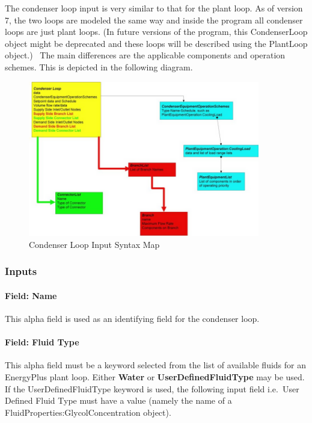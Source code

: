 The condenser loop input is very similar to that for the plant loop. As of version 7, the two loops are modeled the same way and inside the program all condenser loops are just plant loops. (In future versions of the program, this CondenserLoop object might be deprecated and these loops will be described using the PlantLoop object.)~ The main differences are the applicable components and operation schemes. This is depicted in the following diagram.

\begin{figure}[hbtp] %
\centering
\includegraphics[width=0.9\textwidth, height=0.9\textheight, keepaspectratio=true]{media/image136.png}
\caption{Condenser Loop Input Syntax Map \protect \label{fig:condenser-loop-input-syntax-map}}
\end{figure}

\subsubsection{Inputs}\label{inputs-1-032}

\paragraph{Field: Name}\label{field-name-1-031}

This alpha field is used as an identifying field for the condenser loop.

\paragraph{Field: Fluid Type}\label{field-fluid-type-1-000}

This alpha field must be a keyword selected from the list of available fluids for an EnergyPlus plant loop. Either \textbf{Water} or \textbf{UserDefinedFluidType} may be used. If the UserDefinedFluidType keyword is used, the following input field i.e.~User Defined Fluid Type must have a value (namely the name of a FluidProperties:GlycolConcentration object).

